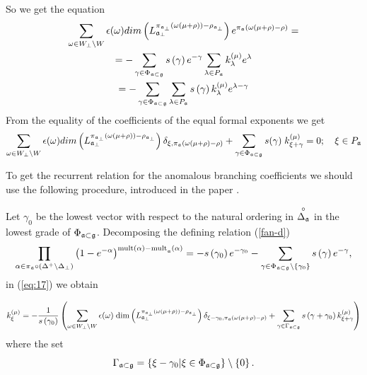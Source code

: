 \documentclass[a4paper,12pt]{article}
\theoremstyle{definition} \newtheorem{Def}{Definition}
\begin{document}
So we get the equation
\begin{multline}
  \label{eq:16}
  \sum_{\omega\in W_{\bot}\backslash W} \epsilon(\omega) dim\left(L^{\pi_{\mathfrak{a}_{\bot}}(\omega(\mu+\rho))-\rho_{\mathfrak{a}_{\bot}}}_{\mathfrak{a}_{\bot}}\right) e^{\pi_{\mathfrak{a}}(\omega(\mu+\rho)-\rho)}=\\
  = -\sum_{\gamma \in \Phi _{\frak{a}\subset \frak{g}}} s\left( \gamma \right) e^{-\gamma }\sum_{\lambda \in P_{\frak{a}}}
  k_{\lambda }^{\left( \mu \right) }e^{\lambda } \\
  =-\sum_{\gamma \in \Phi _{\frak{a}\subset \frak{g}}}\sum_{\lambda \in P_{\frak{a}}}s\left( \gamma \right) k_{\lambda }^{\left( \mu \right)}e^{\lambda -\gamma }
\end{multline}
From the equality of the coefficients of the equal formal exponents we get
\begin{equation}
  \label{eq:17}
   \sum_{\omega\in W_{\bot}\backslash W} \epsilon(\omega) dim\left(L^{\pi_{\mathfrak{a}_{\bot}}(\omega(\mu+\rho))-\rho_{\mathfrak{a}_{\bot}}}_{\mathfrak{a}_{\bot}}\right) \delta_{\xi,\pi_{\mathfrak{a}}(\omega(\mu+\rho)-\rho)}+
   \sum_{\gamma \in \Phi _{\frak{a}\subset \frak{g}}} s(\gamma)\; k^{(\mu)}_{\xi+\gamma}=0;\quad \xi\in P_{\mathfrak{a}}
\end{equation}

To get the recurrent relation for the anomalous branching coefficients we should use the following procedure, introduced in the paper \cite{ilyin812pbc}.

Let $\gamma
_{0} $ be the lowest vector with respect to the natural ordering in $%
\overset{\circ }{\Delta _{\frak{a}}}$ in the lowest grade of $\Phi _{\frak{a}\subset \frak{g}}$. Decomposing the defining relation (\ref{fan-d}) 
\begin{equation}
  \label{eq:18}
  \prod_{\alpha\in \pi_{\mathfrak{a}}\circ (\Delta^{+}\setminus \Delta_{\bot})}\left(
    1-e^{-\alpha }\right) ^{\mathrm{{mult}\left( \alpha \right) -{mult}}_{\frak{a%
      }}\mathrm{\left( \alpha \right) }}=-s\left( \gamma _{0}\right) e^{-\gamma
    _{0}}-\sum_{\gamma \in \Phi _{\frak{a}\subset \frak{g}}\setminus \left\{\gamma_{0}\right\}}s\left( \gamma \right) e^{-\gamma },  
\end{equation}
in (\ref{eq:17}) we obtain

\begin{equation}
  k_{\xi }^{\left( \mu \right) }=
  -\frac{1}{s\left( \gamma _{0}\right) }
  \left(
    \sum_{\omega\in W_{\bot}\backslash W} \epsilon(\omega)\; \mathrm{dim}
    \left(L^{\pi_{\mathfrak{a}_{\bot}}(\omega(\mu+\rho))-\rho_{\mathfrak{a}_{\bot}}}_{\mathfrak{a}_{\bot}}\right)
    \delta_{\xi-\gamma_0,\pi_{\mathfrak{a}}(\omega(\mu+\rho)-\rho)}+
    \sum_{\gamma \in \Gamma _{\frak{a}\subset \frak{g}}} s\left( \gamma +\gamma _{0}\right) k_{\xi+\gamma }^{\left( \mu \right) }
  \right)   
\label{recurrent relation}
\end{equation}
where the set 
\begin{equation}
\Gamma _{\frak{a}\subset \frak{g}}=\left\{ \xi -\gamma _{0}|\xi \in \Phi _{%
\frak{a}\subset \frak{g}}\right\} \setminus \left\{ 0\right\} .
\label{fan-defined}
\end{equation}
\end{document}
